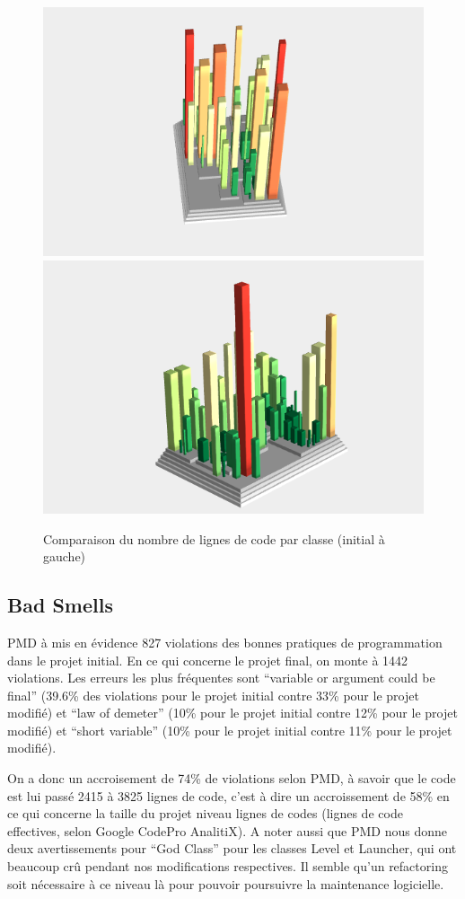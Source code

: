 \documentclass[a4paper,12pt]{report} %
\begin{document}
\begin{figure}[!h]
\includegraphics[scale=0.5]{ressources/final_initial_lines_of_code}\includegraphics[scale=0.5]{ressources/final_new_lines_of_code}\caption{Comparaison du nombre de lignes de code par classe (initial à gauche)}


\end{figure}

\subsection{Bad Smells}
PMD à mis en évidence 827 violations des bonnes pratiques de programmation
dans le projet initial. En ce qui concerne le projet final, on monte
à 1442 violations. Les erreurs les plus fréquentes sont ``variable
or argument could be final'' (39.6\% des violations pour le projet
initial contre 33\% pour le projet modifié) et ``law of demeter''
(10\% pour le projet initial contre 12\% pour le projet modifié) et
``short variable'' (10\% pour le projet initial contre 11\% pour
le projet modifié).

On a donc un accroisement de 74\% de violations selon PMD, à savoir
que le code est lui passé 2415 à 3825 lignes de code, c'est à dire
un accroissement de 58\% en ce qui concerne la taille du projet niveau
lignes de codes (lignes de code effectives, selon Google CodePro AnalitiX).
A noter aussi que PMD nous donne deux avertissements pour ``God Class''
pour les classes Level et Launcher, qui ont beaucoup crû pendant nos
modifications respectives. Il semble qu'un refactoring soit nécessaire
à ce niveau là pour pouvoir poursuivre la maintenance logicielle.
\end{document}
